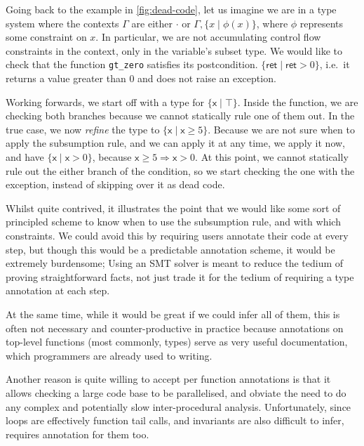 
Going back to the example in \cref{fig:dead-code}, let us imagine we are in a
type system where the contexts $\Gamma$ are either $\cdot$ or $\Gamma, \{ x \mid
\phi(x) \}$, where $\phi$ represents some constraint on $x$. In particular, we
are not accumulating control flow constraints in the context, only
in the variable's subset type. We would like to check that the function
\texttt{gt_zero} satisfies its postcondition. $ \{ \mathsf{ret} \mid
\mathsf{ret} > 0 \} $, i.e.\ it returns a value greater than 0 and does not
raise an exception.

Working forwards, we start off with a type for $\{ \mathsf{x} \mid \top \}$.
Inside the function, we are checking both branches because we cannot statically
rule one of them out. In the true case, we now \emph{refine} the type to $\{
\mathsf{x} \mid \mathsf{x} \geq 5 \}$. Because we are not sure when to apply
the subsumption rule, and we can apply it at any time, we apply it now, and
have $\{ \mathsf{x} \mid \mathsf{x} > 0 \}$, because $\mathsf{x} \geq 5
\Rightarrow \mathsf{x} > 0$. At this point, we cannot statically rule out the
either branch of the condition, so we start checking the one with the
exception, instead of skipping over it as dead code.

Whilst quite contrived, it illustrates the point that we would like some sort
of principled scheme to know when to use the subsumption rule, and with which
constraints. We could avoid this by requiring users annotate their code at
every step, but though this would be a predictable annotation scheme, it would
be extremely burdensome; Using an SMT solver is meant to reduce the tedium of
proving straightforward facts, not just trade it for the tedium of requiring a
type annotation at each step.

At the same time, while it would be great if we could infer all of them, this
is often not necessary and counter-productive in practice because annotations
on top-level functions (most commonly, types) serve as very useful
documentation, which programmers are already used to writing.

Another reason  is quite willing to accept per function annotations is
that it allows checking a large code base to be parallelised, and obviate the
need to do any complex and potentially slow inter-procedural analysis.
Unfortunately, since loops are effectively function tail calls, and invariants
are also difficult to infer,  requires annotation for them too.


